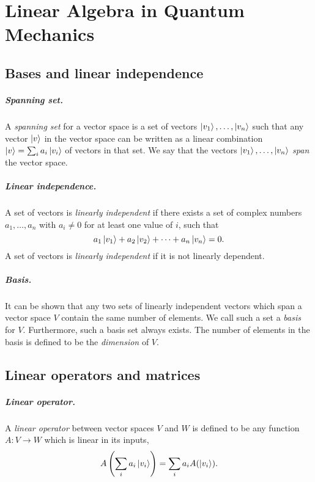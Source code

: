 \chapter{Linear Algebra in Quantum Mechanics}

\section{Bases and linear independence}

\paragraph{Spanning set.} A \emph{spanning set} for a vector space is a set of
vectors $\ket{v_1}, \ldots, \ket{v_n}$ such that any vector $\ket{v}$ in the
vector space can be written as a linear combination $\ket{v} = \sum_i a_i
\ket{v_i}$ of vectors in that set. We say that the vectors $\ket{v_1}, \ldots,
\ket{v_n}$ \emph{span} the vector space.

\paragraph{Linear independence.} A set of vectors is \emph{linearly
independent} if there exists a set of complex numbers $a_1, \ldots, a_n$ with
$a_i \neq 0$ for at least one value of $i$, such that \begin{equation}
  a_1\ket{v_1} + a_2\ket{v_2} + \cdots + a_n\ket{v_n} = 0. \label{eq:lin-ind}
\end{equation} A set of vectors is \emph{linearly independent} if it is not
linearly dependent.

\paragraph{Basis.} It can be shown that any two sets of linearly independent
vectors which span a vector space $V$ contain the same number of elements. We
call such a set a \emph{basis} for $V$. Furthermore, such a basis set always
exists. The number of elements in the basis is defined to be the
\emph{dimension} of $V$.

\section{Linear operators and matrices}

\paragraph{Linear operator.} A \emph{linear operator} between vector spaces $V$
and $W$ is defined to be any function $A : V \rightarrow W$ which is linear in
its inputs, \begin{equation}
  A\left(\sum_i a_i\ket{v_i} \right) = \sum_i a_i A(\ket{v_i}).
  \label{eq:lin-op}
\end{equation}

